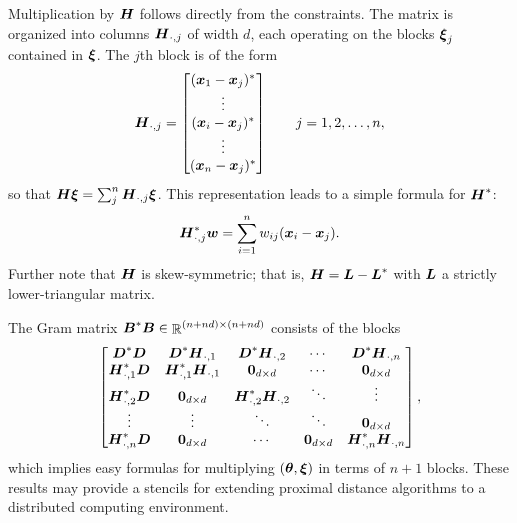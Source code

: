 \documentclass{article}
\begin{document}
Multiplication by \(\boldsymbol{H}\) follows directly from the constraints.
The matrix is organized into columns \(\boldsymbol{H}_{\cdot, j}\) of width \(d\), each operating on the blocks \(\boldsymbol{\xi}_{j}\) contained in \(\boldsymbol{\xi}\).
The \(j\)th block is of the form
\begin{equation}
    \label{eq:operator_H_redundant}
    \boldsymbol{H}_{\cdot,j}
    =
    \begin{bmatrix}
        (\boldsymbol{x}_{1} - \boldsymbol{x}_{j})^{\ast} \\
        \vdots \\
        (\boldsymbol{x}_{i} - \boldsymbol{x}_{j})^{\ast} \\
        \vdots \\
        (\boldsymbol{x}_{n} - \boldsymbol{x}_{j})^{\ast} \\
    \end{bmatrix}
    \qquad
    j = 1,2,\ldots,n,
\end{equation}
so that \(\boldsymbol{H} \boldsymbol{\xi} = \sum_{j}^{n} \boldsymbol{H}_{\cdot,j} \boldsymbol{\xi}\).
This representation leads to a simple formula for \(\boldsymbol{H}^{\ast}\):
\begin{equation}
    \label{eq:operator_Ht_redundant}
    \boldsymbol{H}_{\cdot,j}^{\ast} \boldsymbol{w}
    =
    \sum_{i=1}^{n} w_{ij} (\boldsymbol{x}_{i} - \boldsymbol{x}_{j}).
\end{equation}
Further note that \(\boldsymbol{H}\) is skew-symmetric; that is, \(\boldsymbol{H} = \boldsymbol{L} - \boldsymbol{L}^{\ast}\) with \(\boldsymbol{L}\) a strictly lower-triangular matrix.

The Gram matrix \(\boldsymbol{B}^{\ast} \boldsymbol{B} \in \mathop{\mathbb{R}}\nolimits^{(n+nd) \times (n+nd)}\) consists of the blocks
\begin{equation*}
    \begin{bmatrix}
        \boldsymbol{D}^{\ast} \boldsymbol{D}
        & \boldsymbol{D}^{\ast} \boldsymbol{H}_{\cdot,1}
        & \boldsymbol{D}^{\ast} \boldsymbol{H}_{\cdot,2}
        & \cdots
        & \boldsymbol{D}^{\ast} \boldsymbol{H}_{\cdot,n} \\
        \boldsymbol{H}_{\cdot,1}^{\ast} \boldsymbol{D}
        & \boldsymbol{H}_{\cdot,1}^{\ast} \boldsymbol{H}_{\cdot,1}
        & \boldsymbol{0}_{d \times d}
        & \cdots
        & \boldsymbol{0}_{d \times d} \\
        \boldsymbol{H}_{\cdot,2}^{\ast} \boldsymbol{D}
        & \boldsymbol{0}_{d \times d}
        & \boldsymbol{H}_{\cdot,2}^{\ast} \boldsymbol{H}_{\cdot,2}
        & \ddots
        & \vdots \\
        \vdots
        & \vdots
        & \ddots
        & \ddots
        & \boldsymbol{0}_{d \times d} \\
       \boldsymbol{H}_{\cdot,n}^{\ast} \boldsymbol{D}
        & \boldsymbol{0}_{d \times d}
        & \cdots
        & \boldsymbol{0}_{d \times d}
        &\boldsymbol{H}_{\cdot,n}^{\ast} \boldsymbol{H}_{\cdot,n}
    \end{bmatrix},
\end{equation*}
which implies easy formulas for multiplying \((\boldsymbol{\theta}, \boldsymbol{\xi})\) in terms of \(n+1\) blocks.
These results may provide a stencils for extending proximal distance algorithms to a distributed computing environment.
\end{document}
